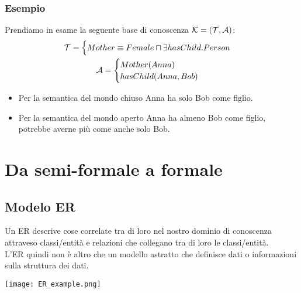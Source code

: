\documentclass[../main.tex]{subfiles}
\begin{document}
   \subsubsection{Esempio}
   Prendiamo in esame la seguente base di conoscenza $\mathcal{K}=(\mathcal{T},\mathcal{A})$:
   \begin{gather*}
      \mathcal{T}=
      \begin{cases}
         Mother \equiv Female \sqcap \exists hasChild.Person
      \end{cases}\\
      \mathcal{A}=
      \begin{cases}
         Mother(Anna)\\
         hasChild(Anna, Bob)
      \end{cases}
   \end{gather*}
   \begin{itemize}
      \item Per la semantica del mondo chiuso Anna ha solo Bob come figlio.
      \item Per la semantica del mondo aperto Anna ha almeno Bob come figlio, potrebbe averne più come anche solo Bob.
   \end{itemize}
   
   \section{Da semi-formale a formale}
   \subsection{Modelo ER}
   Un ER descrive cose correlate tra di loro nel nostro dominio di conoscenza attraveso classi/entità e relazioni che collegano tra di loro le classi/entità.\\
   L'ER quindi non è altro che un modello astratto che definisce dati o informazioni  sulla struttura dei dati.
   \begin{center}
      \texttt{[image: ER\_example.png]}
   \end{center}
\end{document}
